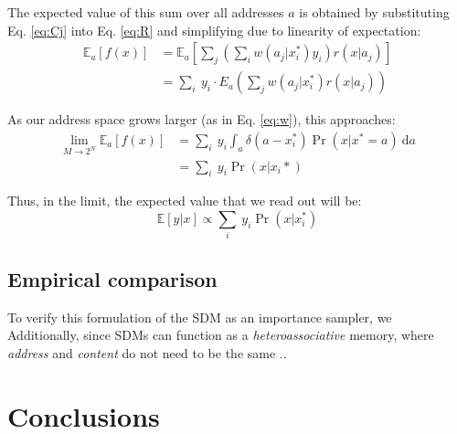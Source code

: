 \documentclass[10pt,letterpaper]{article}
\begin{document}
The expected value of this sum over all addresses $a$ is obtained by
substituting Eq. \ref{eq:Cj} into Eq. \ref{eq:R} and simplifying due
to linearity of expectation:
\begin{align}
\mathbb{E}_a[f(x)]&=\mathbb{E}_a\left[\sum_j\left(\sum_i w(a_j| x_i^*)y_i\right)r(x|a_j)\right]\\
&=\sum_i\ y_i\cdot E_a\left(\sum_j w(a_j| x_i^*)r(x|a_j)\right)
\end{align}

As our address space grows larger (as in Eq. \ref{eq:w}), this approaches:
\begin{align}
\lim_{M\rightarrow 2^N} \mathbb{E}_a[f(x)]&=\sum_i\ y_i \int_a \delta(a-x_i^*)\Pr(x|x^*=a)\ \mathrm{d}a\\
&= \sum_i\ y_i\Pr(x|x_i*)
\end{align}

Thus, in the limit, the expected value that we read out will be:
\begin{equation}
\mathbb{E}[y|x]\propto \sum_i\ y_i\Pr(x|x_i^*)
\end{equation}

\subsection{Empirical comparison}

To verify this formulation of the SDM as an importance sampler, we 
\\
Additionally, since SDMs can function as a \textit{heteroassociative} memory, where \textit{address} and \textit{content} do not need to be the same ..

\section{Conclusions}



\end{document}
